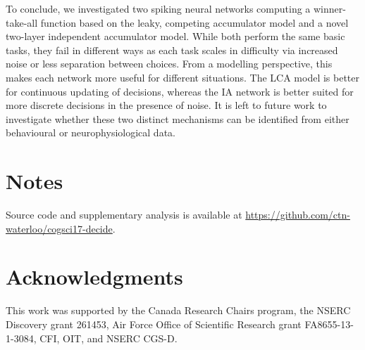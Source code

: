 \documentclass[10pt,letterpaper]{article}
\begin{document}
To conclude, we investigated two spiking neural networks computing a winner-take-all function based on the leaky, competing accumulator model and a novel two-layer independent accumulator model.
While both perform the same basic tasks, they fail in different ways as each task scales in difficulty via increased noise or less separation between choices.
From a modelling perspective, this makes each network more useful for different situations.
The LCA model is better for continuous updating of decisions, whereas the IA network is better suited for more discrete decisions in the presence of noise.
It is left to future work to investigate whether these two distinct mechanisms can be identified from either behavioural or neurophysiological data.

\section{Notes}
Source code and supplementary analysis is available at \url{https://github.com/ctn-waterloo/cogsci17-decide}.

\section{Acknowledgments}
This work was supported by the Canada Research Chairs program,
the NSERC Discovery grant 261453, Air Force Office of Scientific Research grant FA8655-13-1-3084, CFI, OIT, and NSERC CGS-D\@.  %



\setlength{\bibleftmargin}{.125in}
\setlength{\bibindent}{-\bibleftmargin}


\end{document}
